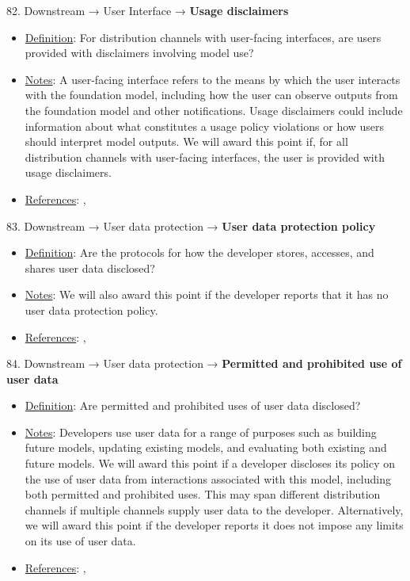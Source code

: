 82. Downstream → User Interface → \textbf{Usage disclaimers}
\vspace{-\parskip}
\begin{itemize}
\item
\underline{Definition}: For distribution channels with user-facing interfaces, are users provided with disclaimers involving model use?
\item
\underline{Notes}: A user-facing interface refers to the means by which the user interacts with the foundation model, including how the user can observe outputs from the foundation model and other notifications. Usage disclaimers could include information about what constitutes a usage policy violations or how users should interpret model outputs. We will award this point if, for all distribution channels with user-facing interfaces, the user is provided with usage disclaimers.
\item
\underline{References}: \citet{qiaosi2023ux}, \citet{nakao2022responsible}
\end{itemize} \vspace{\baselineskip}


83. Downstream → User data protection → \textbf{User data protection policy}
\vspace{-\parskip}
\begin{itemize}
\item
\underline{Definition}: Are the protocols for how the developer stores, accesses, and shares user data disclosed?
\item
\underline{Notes}: We will also award this point if the developer reports that it has no user data protection policy.
\item
\underline{References}: \citet{nissenbaum2004contextual}, \citet{king2020privacy}
\end{itemize} \vspace{\baselineskip}


84. Downstream → User data protection → \textbf{Permitted and prohibited use of user data}
\vspace{-\parskip}
\begin{itemize}
\item
\underline{Definition}: Are permitted and prohibited uses of user data disclosed?
\item
\underline{Notes}: Developers use user data for a range of purposes such as building future models, updating existing models, and evaluating both existing and future models. We will award this point if a developer discloses its policy on the use of user data from interactions associated with this model, including both permitted and prohibited uses. This may span different distribution channels if multiple channels supply user data to the developer. Alternatively, we will award this point if the developer reports it does not impose any limits on its use of user data.
\item
\underline{References}: \citet{nissenbaum2004contextual}, \citet{king2020privacy}
\end{itemize} \vspace{\baselineskip}


